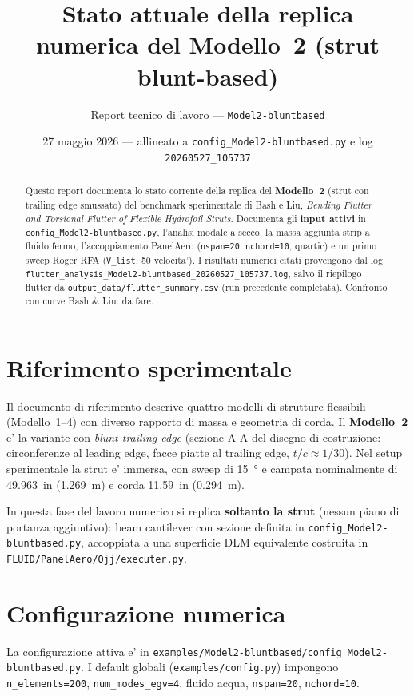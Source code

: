\documentclass[11pt,a4paper]{article}
\title{Stato attuale della replica numerica del Modello~2 (strut blunt-based)}
\author{Report tecnico di lavoro --- \texttt{Model2-bluntbased}}
\date{27 maggio 2026 --- allineato a \texttt{config\_Model2-bluntbased.py} e log \texttt{20260527\_105737}}
\begin{document}
\maketitle

\begin{abstract}
Questo report documenta lo stato corrente della replica del \textbf{Modello~2} (strut con
trailing edge smussato) del benchmark sperimentale di Bash e Liu,
\emph{Bending Flutter and Torsional Flutter of Flexible Hydrofoil Struts}.
Documenta gli \textbf{input attivi} in \texttt{config\_Model2-bluntbased.py}, l'analisi
modale a secco, la massa aggiunta strip a fluido fermo, l'accoppiamento PanelAero
(\texttt{nspan=20}, \texttt{nchord=10}, quartic) e un primo sweep Roger RFA
(\texttt{V\_list}, 50 velocita'). I risultati numerici citati provengono dal log
\texttt{flutter\_analysis\_Model2-bluntbased\_20260527\_105737.log}, salvo il riepilogo
flutter da \texttt{output\_data/flutter\_summary.csv} (run precedente completata).
Confronto con curve Bash \& Liu: da fare.
\end{abstract}

\section{Riferimento sperimentale}

Il documento di riferimento descrive quattro modelli di strutture flessibili
(Modello~1--4) con diverso rapporto di massa e geometria di corda. Il \textbf{Modello~2}
e' la variante con \emph{blunt trailing edge} (sezione A-A del disegno di costruzione:
circonferenze al leading edge, facce piatte al trailing edge, $t/c \approx 1/30$).
Nel setup sperimentale la strut e' immersa, con sweep di \SI{15}{\degree} e campata
nominalmente di \SI{49.963}{in} (\SI{1.269}{\meter}) e corda \SI{11.59}{in}
(\SI{0.294}{\meter}).

In questa fase del lavoro numerico si replica \textbf{soltanto la strut} (nessun piano
di portanza aggiuntivo): beam cantilever con sezione definita in
\texttt{config\_Model2-bluntbased.py}, accoppiata a una superficie DLM equivalente
costruita in \texttt{FLUID/PanelAero/Qjj/executer.py}.

\section{Configurazione numerica}

La configurazione attiva e' in
\texttt{examples/Model2-bluntbased/config\_Model2-bluntbased.py}.
I default globali (\texttt{examples/config.py}) impongono \texttt{n\_elements=200},
\texttt{num\_modes\_egv=4}, fluido acqua, \texttt{nspan=20}, \texttt{nchord=10}.
\end{document}
